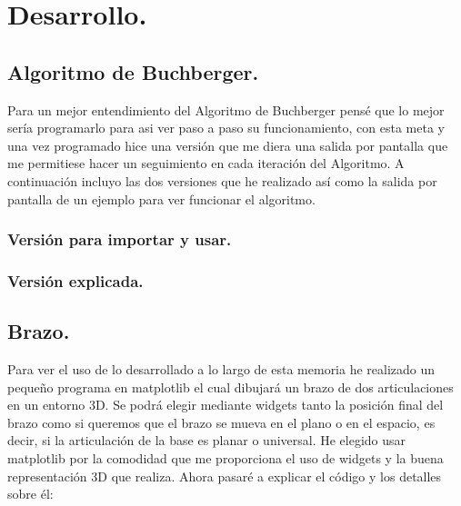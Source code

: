 \chapter{Desarrollo.}
\section{Algoritmo de Buchberger.}
Para un mejor entendimiento del Algoritmo de Buchberger pensé que lo mejor sería programarlo para asi ver paso a paso su funcionamiento, con esta meta y una vez programado hice una versión que me diera una salida por pantalla que me permitiese hacer un seguimiento en cada iteración del Algoritmo. A continuación incluyo las dos versiones que he realizado así como la salida por pantalla de un ejemplo para ver funcionar el algoritmo.

\subsection{Versión para importar y usar.} 


\subsection{Versión explicada.} 


\section{Brazo.}
Para ver el uso de lo desarrollado a lo largo de esta memoria he realizado un pequeño programa en matplotlib el cual dibujará un brazo de dos articulaciones en un entorno 3D. Se podrá elegir mediante widgets tanto la posición final del brazo como si queremos que el brazo se mueva en el plano o en el espacio, es decir, si la articulación de la base es planar o universal.
He elegido usar matplotlib por la comodidad que me proporciona el uso de widgets y la buena representación 3D que realiza. Ahora pasaré a explicar el código y los detalles sobre él:

